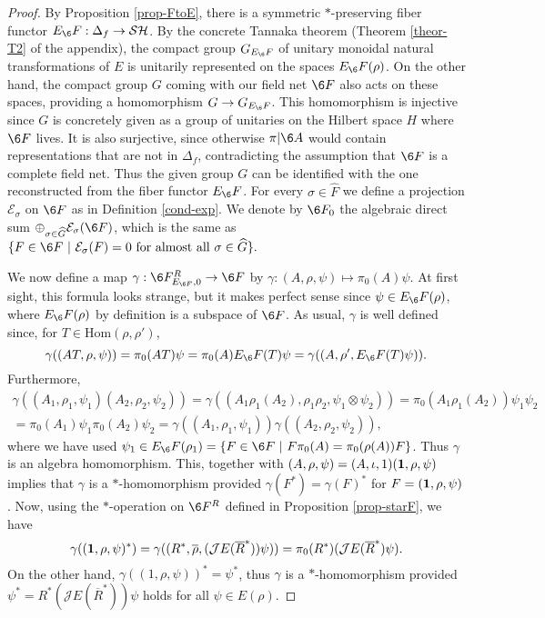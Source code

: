 \documentclass[12pt]{article}
\theoremstyle{definition}
\theoremstyle{definition}
\theoremstyle{remark}
\def\2#1{{\mathcal #1}}
\def\1#1{{\bf #1}}
\def\ol#1{{\overline #1}}
\newcommand{\Hom}{\mathrm{Hom}}
\newcommand{\rarr}{\rightarrow}
\begin{document}
\begin{proof} By Proposition \ref{prop-FtoE}, there is
  a symmetric $*$-preserving fiber functor
  $E_\6F:\Delta_f\rarr\2S\2H$. By the concrete Tannaka
  theorem (Theorem \ref{theor-T2} of the appendix), the
  compact group $G_{E_\6F}$ of unitary monoidal natural
  transformations of $E$ is unitarily represented on
  the spaces $E_\6F(\rho)$. On the other hand, the
  compact group $G$ coming with our field net $\6F$
  also acts on these spaces, providing a homomorphism
  $G\rarr G_{E_\6F}$. This homomorphism is injective
  since $G$ is concretely given as a group of unitaries
  on the Hilbert space $H$ where $\6F$ lives. It is
  also surjective, since otherwise $\pi|\6A$ would
  contain representations that are not in $\Delta_f$,
  contradicting the assumption that $\6F$ is a complete
  field net. Thus the given group $G$ can be identified
  with the one reconstructed from the fiber functor
  $E_\6F$. For every $\sigma\in\widehat{F}$ we define a
  projection $\2E_\sigma$ on $\6F$ as in Definition
  \ref{cond-exp}. We denote by $\6F_0$ the algebraic
  direct sum
  $\oplus_{\sigma\in\widehat{G}}\2E_\sigma(\6F)$, which
  is the same as $\{ F\in\6F\ | \ \2E_\sigma(F)=0\
  \mbox{for almost all}\ \sigma\in\widehat{G}\}.$

We now define a map $\gamma:\6F^R_{E_{\6F},0}\rarr\6F$ by 
$\gamma:(A,\rho,\psi)\mapsto\pi_0(A)\psi$. At first sight, this formula looks strange, but it makes
perfect sense since $\psi\in E_\6F(\rho)$, where $E_\6F(\rho)$ by definition is a subspace of $\6F$.
As usual, $\gamma$ is well defined since, for $T\in\Hom(\rho,\rho')$,
\[ \gamma((AT,\rho,\psi))=\pi_0(AT)\psi=\pi_0(A)E_\6F(T)\psi   =\gamma((A,\rho',E_\6F(T)\psi)). \]
Furthermore,
\begin{multline*}  \gamma((A_1,\rho_1,\psi_1)(A_2,\rho_2,\psi_2)) =
  \gamma((A_1\rho_1(A_2),\rho_1\rho_2,\psi_1\otimes\psi_2)) 
   =\pi_0(A_1\rho_1(A_2))\psi_1\psi_2  \\ 
    = \pi_0(A_1)\psi_1\pi_0(A_2)\psi_2 
   = \gamma((A_1,\rho_1,\psi_1))\gamma((A_2,\rho_2,\psi_2)), 
\end{multline*}
where we have used $\psi_1\in E_\6F(\rho_1)=\{F\in\6F\ | \ F\pi_0(A)=\pi_0(\rho(A))F\}$. Thus
$\gamma$ is an algebra homomorphism. This, together with $(A,\rho,\psi)=(A,\iota,1)(\11,\rho,\psi)$
implies that $\gamma$ is a $*$-homomorphism provided $\gamma(F^*)=\gamma(F)^*$ for
$F=(\11,\rho,\psi)$. Now, using the $*$-operation on $\6F^R$ defined in Proposition
\ref{prop-starF}, we have 
\[ \gamma((\11,\rho,\psi)^*)=\gamma((R^*,\ol\rho,(\2JE(\overline{R}^*))\psi))
  = \pi_0(R^*)(\2JE(\overline{R}^*)\psi). \]
On the other hand, $\gamma((1,\rho,\psi))^*=\psi^*$, thus $\gamma$ is a $*$-homomorphism provided 
$\psi^*=R^*(\2JE(\overline{R}^*))\psi$ holds for all $\psi\in E(\rho)$.


\end{proof}
\end{document}
